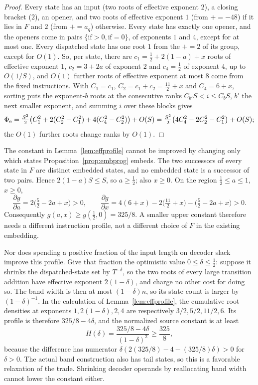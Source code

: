 \documentclass[11pt]{article}
\theoremstyle{remark}
\begin{document}
\begin{proof}
Every state has an input (two roots of effective exponent $2$), a closing bracket
($2$), an opener, and two roots of effective exponent $1$ (from $\mathord{+}\!=-48$)
if it lies in $F$ and $2$ (from $\mathord{+}\!=a_q$) otherwise.  Every state has
exactly one opener, and the openers come in pairs $\{\text{if}>0,\text{if}=0\}$, of
exponents $1$ and $4$, except for at most one.  Every dispatched state has one root
$1$ from the $\mathord{+}\!=2$ of its group, except for $O(1)$.  So, per state, there
are $c_1=\frac12+2(1-a)+x$ roots of effective exponent $1$, $c_2=3+2a$ of exponent
$2$ and $c_4=\frac12$ of exponent $4$, up to $O(1/S)$, and $O(1)$ further roots of
effective exponent at most $8$ come from the fixed instructions.  With
$C_1=c_1$, $C_2=c_1+c_2=\frac{11}2+x$ and $C_4=6+x$, sorting puts the exponent-$b$
roots at the consecutive ranks $C_{b'}S<i\le C_bS$, $b'$ the next smaller exponent,
and summing $i$ over these blocks gives
\[
 \Phi_{\rm e}=\tfrac{S^2}2\bigl(C_1^2+2(C_2^2-C_1^2)+4(C_4^2-C_2^2)\bigr)+O(S)
 =\tfrac{S^2}2\bigl(4C_4^2-2C_2^2-C_1^2\bigr)+O(S);
\]
the $O(1)$ further roots change ranks by $O(1)$.
\end{proof}

The constant in Lemma~\ref{lem:effprofile} cannot be improved by changing only
which states Proposition~\ref{prop:embprog} embeds.  The two successors of every
state in $F$ are distinct embedded states, and no embedded state is a successor
of two pairs.  Hence $2(1-a)S\le S$, so $a\ge\frac12$; also $x\ge0$.  On the
region $\frac12\le a\le1$, $x\ge0$,
\[
 \frac{\partial g}{\partial a}=2\bigl(\tfrac52-2a+x\bigr)>0,
 \qquad
 \frac{\partial g}{\partial x}=4(6+x)-2\bigl(\tfrac{11}2+x\bigr)
 -\bigl(\tfrac52-2a+x\bigr)>0.
\]
Consequently $g(a,x)\ge g(\frac12,0)=325/8$.  A smaller upper
constant therefore needs a different instruction profile, not a different
choice of $F$ in the existing embedding.

Nor does spending a positive fraction of the input length on decoder slack
improve this profile.  Give that fraction the optimistic value
$0\le\delta\le\frac12$: suppose it shrinks the dispatched-state set by
$T^{-\delta}$, so the two roots of every large transition addition have
effective exponent $2(1-\delta)$, and charge no other cost for doing so.
The band width is then at most $(1-\delta)n$, so its state count is larger
by $(1-\delta)^{-1}$.  In the calculation of
Lemma~\ref{lem:effprofile}, the cumulative root densities at exponents
$1,2(1-\delta),2,4$ are respectively $3/2,5/2,11/2,6$.  Its profile is
therefore $325/8-4\delta$, and the normalized source constant is at least
\[
 H(\delta)=\frac{325/8-4\delta}{(1-\delta)^2}\ge\frac{325}8,
\]
because the difference has numerator
$\delta(2(325/8)-4-(325/8)\delta)>0$ for $\delta>0$.  The actual band
construction also has tail states, so this is a favorable relaxation of
the trade.  Shrinking decoder operands by reallocating band width cannot
lower the constant either.
\end{document}
